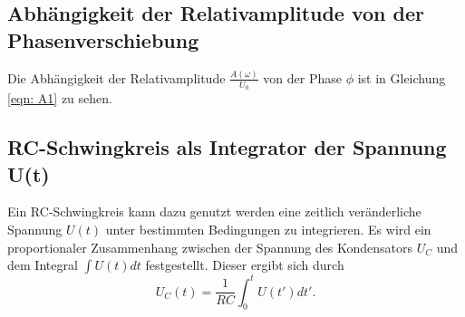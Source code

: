 \subsection{Abhängigkeit der Relativamplitude von der Phasenverschiebung}
Die Abhängigkeit der Relativamplitude $\frac{A(\omega)}{U_{0}}$ von der Phase $\phi$ ist in
Gleichung \eqref{eqn: A1} zu sehen.

\subsection{RC-Schwingkreis als Integrator der Spannung U(t)}
Ein RC-Schwingkreis kann dazu genutzt werden eine zeitlich veränderliche Spannung $U(t)$ unter bestimmten Bedingungen zu integrieren. 
Es wird ein proportionaler Zusammenhang zwischen der Spannung des Kondensators $U_{C}$ und dem Integral $\int U(t) dt$ festgestellt. Dieser ergibt sich durch 
\begin{equation}
    U_{C}(t) = \frac{1}{RC} \int_{0}^{t} U(t') dt'.
\end{equation}